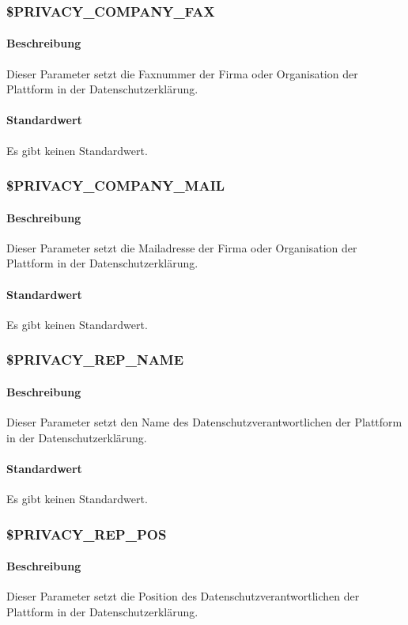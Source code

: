 \subsubsection{\$PRIVACY\_COMPANY\_FAX} \label{config:privacy-comp-fax}
\paragraph{Beschreibung}Dieser Parameter setzt die Faxnummer der Firma oder Organisation der Plattform in der Datenschutzerklärung.
\paragraph{Standardwert}Es gibt keinen Standardwert.

\subsubsection{\$PRIVACY\_COMPANY\_MAIL} \label{config:privacy-comp-mail}
\paragraph{Beschreibung}Dieser Parameter setzt die Mailadresse der Firma oder Organisation der Plattform in der Datenschutzerklärung.
\paragraph{Standardwert}Es gibt keinen Standardwert.

\subsubsection{\$PRIVACY\_REP\_NAME} \label{config:privacy-rep-name}
\paragraph{Beschreibung}Dieser Parameter setzt den Name des Datenschutzverantwortlichen der Plattform in der Datenschutzerklärung.
\paragraph{Standardwert}Es gibt keinen Standardwert.

\subsubsection{\$PRIVACY\_REP\_POS}\label{config:privacy-rep-pos}
\paragraph{Beschreibung}Dieser Parameter setzt die Position des Datenschutzverantwortlichen der Plattform in der Datenschutzerklärung.
